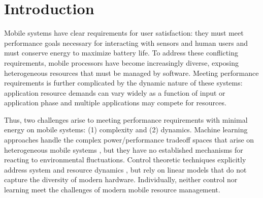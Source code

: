 \section{Introduction}
Mobile systems have clear requirements for user satisfaction: they
must meet performance goals necessary for interacting with sensors and
human users and must conserve energy to maximize battery life.  To
address these conflicting requirements, mobile processors have become
increasingly diverse, exposing heterogeneous resources that must be
managed by software. Meeting performance requirements is further
complicated by the dynamic nature of these systems: application
resource demands can vary widely as a function of input or application
phase and multiple applications may compete for resources.

Thus, two challenges arise to meeting performance requirements with
minimal energy on mobile systems: (1) complexity and (2) dynamics.
Machine learning approaches handle the complex power/performance
tradeoff spaces that arise on heterogeneous mobile systems
\cite{reddiHPCA2013,dubach2010,Bitirgen2008,Ipek,Koala,LEO,Flicker,Ponamarev},
but they have no established mechanisms for reacting to environmental
fluctuations.    Control theoretic techniques explicitly address
system and resource dynamics
\cite{Hellerstein2004a,Chen2011,PTRADE,POET,ControlWare,Agilos,grace2},
but rely on linear models that do not capture the diversity of modern
hardware.   Individually, neither control nor learning
meet the challenges of modern mobile resource management.

